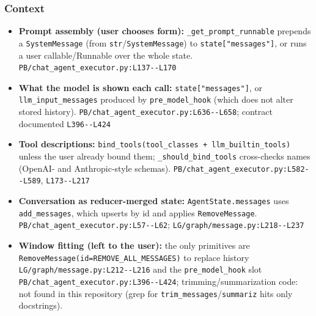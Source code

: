\subsubsection*{Context}
\begin{itemize}
\item \textbf{Prompt assembly (user chooses form):} \texttt{\_\allowbreak{}get\_\allowbreak{}prompt\_\allowbreak{}runnable} prepends a \texttt{SystemMessage} (from \texttt{str}/\texttt{SystemMessage}) to \texttt{state["messages"]}, or runs a user callable/Runnable over the whole state. \texttt{PB/\allowbreak{}chat\_\allowbreak{}agent\_\allowbreak{}executor.\allowbreak{}py:\allowbreak{}L137-\allowbreak{}-\allowbreak{}L170}
\item \textbf{What the model is shown each call:} \texttt{state["messages"]}, or \texttt{llm\_\allowbreak{}input\_\allowbreak{}messages} produced by \texttt{pre\_\allowbreak{}model\_\allowbreak{}hook} (which does not alter stored history). \texttt{PB/\allowbreak{}chat\_\allowbreak{}agent\_\allowbreak{}executor.\allowbreak{}py:\allowbreak{}L636-\allowbreak{}-\allowbreak{}L658}; contract documented \texttt{L396-\allowbreak{}-\allowbreak{}L424}
\item \textbf{Tool descriptions:} \texttt{bind\_\allowbreak{}tools(\allowbreak{}tool\_\allowbreak{}classes + llm\_\allowbreak{}builtin\_\allowbreak{}tools)} unless the user already bound them; \texttt{\_\allowbreak{}should\_\allowbreak{}bind\_\allowbreak{}tools} cross-checks names (OpenAI- and Anthropic-style schemas). \texttt{PB/\allowbreak{}chat\_\allowbreak{}agent\_\allowbreak{}executor.\allowbreak{}py:\allowbreak{}L582-\allowbreak{}-\allowbreak{}L589}, \texttt{L173-\allowbreak{}-\allowbreak{}L217}
\item \textbf{Conversation as reducer-merged state:} \texttt{AgentState.\allowbreak{}messages} uses \texttt{add\_\allowbreak{}messages}, which upserts by id and applies \texttt{RemoveMessage}. \texttt{PB/\allowbreak{}chat\_\allowbreak{}agent\_\allowbreak{}executor.\allowbreak{}py:\allowbreak{}L57-\allowbreak{}-\allowbreak{}L62}; \texttt{LG/\allowbreak{}graph/\allowbreak{}message.\allowbreak{}py:\allowbreak{}L218-\allowbreak{}-\allowbreak{}L237}
\item \textbf{Window fitting (left to the user):} the only primitives are \texttt{RemoveMessage(\allowbreak{}id=REMOVE\_\allowbreak{}ALL\_\allowbreak{}MESSAGES)} to replace history \texttt{LG/\allowbreak{}graph/\allowbreak{}message.\allowbreak{}py:\allowbreak{}L212-\allowbreak{}-\allowbreak{}L216} and the \texttt{pre\_\allowbreak{}model\_\allowbreak{}hook} slot \texttt{PB/\allowbreak{}chat\_\allowbreak{}agent\_\allowbreak{}executor.\allowbreak{}py:\allowbreak{}L396-\allowbreak{}-\allowbreak{}L424}; trimming/summarization code: not found in this repository (grep for \texttt{trim\_\allowbreak{}messages}/\texttt{summariz} hits only docstrings).

\end{itemize}
